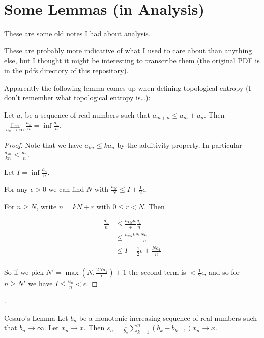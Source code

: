 \chapter{Some Lemmas (in Analysis)}

These are some old notes I had about analysis.

These are probably more indicative of what I used to care about than anything else,
but I thought it might be interesting to transcribe them (the original PDF is in the pdfs directory of this repository).

Apparently the following lemma comes up when defining topological entropy (I don't remember what topological entropy is\ldots):

\begin{lemma}
Let \(a_i\) be a sequence of real numbers such that \(a_{m + n} \leq a_m + a_n\).
Then \(\lim\limits_{a_n \to \infty} \frac{a_n}{n} = \inf \frac{a_n}{n}\).
\end{lemma}

\begin{proof}
Note that we have \(a_{kn} \leq k a_n\) by the additivity property.
In particular \(\frac{a_{kn}}{kn} \leq \frac{a_n}{n}\).

Let \(I = \inf \frac{a_n}{n}\).

For any \(\epsilon > 0\) we can find \(N\) with \(\frac{a_N}{N} \leq I + \frac{1}{2}\epsilon\).

For \(n \geq N\), write \(n = kN + r\) with \(0 \leq r < N\).
Then

\begin{align*}
\frac{a_n}{n} &\leq \frac{a_{kN}{n}} + \frac{a_r}{n}\\
&\leq \frac{a_{kN}{kN}} + \frac{N a_1}{n}\\
&\leq I + \frac{1}{2} \epsilon + \frac{N a_1}{n}\\
\end{align*}

So if we pick \(N' = \max(N, \frac{2 N a_1}{\epsilon}) + 1\) the second term is \(< \frac{1}{2}\epsilon\),
and so for \(n \geq N'\) we have \(I \leq \frac{a_n}{n} < \epsilon\).
\end{proof}.

\begin{lemma}{Cesaro's Lemma}
Let \(b_n\) be a monotonic increasing sequence of real numbers such that \(b_n \to \infty\).
Let \(x_n \to x\).
Then \(s_n = \frac{1}{b_n} \sum\limits_{k = 1}^n (b_k - b_{k - 1}) x_n \to x\).
\end{lemma}

